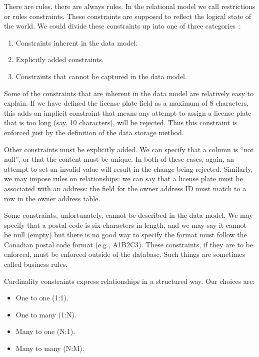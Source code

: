 There are rules, there are always rules. In the relational model we call restrictions or rules constraints. These constraints are supposed to reflect the logical state of the world. We could divide these constraints up into one of three categories~\cite{fds}:

\begin{enumerate}
\item Constraints inherent in the data model.
\item Explicitly added constraints.
\item Constraints that cannot be captured in the data model. 
\end{enumerate}

Some of the constraints that are inherent in the data model are relatively easy to explain. If we have defined the license plate field as a maximum of 8 characters, this adds an implicit constraint that means any attempt to assign a license plate that is too long (say, 10 characters), will be rejected. Thus this constraint is enforced just by the definition of the data storage method.

Other constraints must be explicitly added. We can specify that a column is ``not null'', or that the content must be unique. In both of these cases, again, an attempt to set an invalid value will result in the change being rejected. Similarly, we may impose rules on relationships: we can say that a license plate must be associated with an address: the field for the owner address ID must match to a row in the owner address table.

Some constraints, unfortunately, cannot be described in the data model. We may specify that a postal code is six characters in length, and we may say it cannot be null (empty) but there is no good way to specify the format must follow the Canadian postal code format (e.g., A1B2C3). These constraints, if they are to be enforced, must be enforced outside of the database. Such things are sometimes called business rules.

Cardinality constraints express relationships in a structured way. Our choices are:

\begin{itemize}
\item One to one (1:1).
\item One to many (1:N).
\item Many to one (N:1).
\item Many to many (N:M).
\end{itemize}

